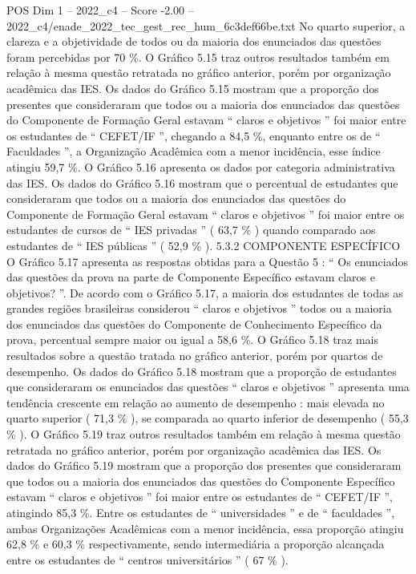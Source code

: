 \begin{textsample}{POS Dim 1 – 2022\_c4 – Score -2.00 – 2022\_c4/enade\_2022\_tec\_gest\_rec\_hum\_6c3def66be.txt}
No quarto superior, a clareza e a objetividade de todos ou da maioria dos enunciados das questões foram percebidas por 70 \%.
O Gráfico 5.15 traz outros resultados também em relação à mesma questão retratada no gráfico anterior, porém por organização acadêmica das IES.
Os dados do Gráfico 5.15 mostram que a proporção dos presentes que consideraram que todos ou a maioria dos enunciados das questões do Componente de Formação Geral estavam “ claros e objetivos ” foi maior entre os estudantes de “ CEFET/IF ”, chegando a 84,5 \%, enquanto entre os de “ Faculdades ”, a Organização Acadêmica com a menor incidência, esse índice atingiu 59,7 \%.
O Gráfico 5.16 apresenta os dados por categoria administrativa das IES.
Os dados do Gráfico 5.16 mostram que o percentual de estudantes que consideraram que todos ou a maioria dos enunciados das questões do Componente de Formação Geral estavam “ claros e objetivos ” foi maior entre os estudantes de cursos de “ IES privadas ” ( 63,7 \% ) quando comparado aos estudantes de “ IES públicas ” ( 52,9 \% ). 5.3.2 COMPONENTE ESPECÍFICO O Gráfico 5.17 apresenta as respostas obtidas para a Questão 5 : “ Os enunciados das questões da prova na parte de Componente Específico estavam claros e objetivos? ”.
De acordo com o Gráfico 5.17, a maioria dos estudantes de todas as grandes regiões brasileiras considerou “ claros e objetivos ” todos ou a maioria dos enunciados das questões do Componente de Conhecimento Específico da prova, percentual sempre maior ou igual a 58,6 \%.
O Gráfico 5.18 traz mais resultados sobre a questão tratada no gráfico anterior, porém por quartos de desempenho.
Os dados do Gráfico 5.18 mostram que a proporção de estudantes que consideraram os enunciados das questões “ claros e objetivos ” apresenta uma tendência crescente em relação ao aumento de desempenho : mais elevada no quarto superior ( 71,3 \% ), se comparada ao quarto inferior de desempenho ( 55,3 \% ).
O Gráfico 5.19 traz outros resultados também em relação à mesma questão retratada no gráfico anterior, porém por organização acadêmica das IES.
Os dados do Gráfico 5.19 mostram que a proporção dos presentes que consideraram que todos ou a maioria dos enunciados das questões do Componente Específico estavam “ claros e objetivos ” foi maior entre os estudantes de “ CEFET/IF ”, atingindo 85,3 \%.
Entre os estudantes de “ universidades ” e de “ faculdades ”, ambas Organizações Acadêmicas com a menor incidência, essa proporção atingiu 62,8 \% e 60,3 \% respectivamente, sendo intermediária a proporção alcançada entre os estudantes de “ centros universitários ” ( 67 \% ).

\end{textsample}
